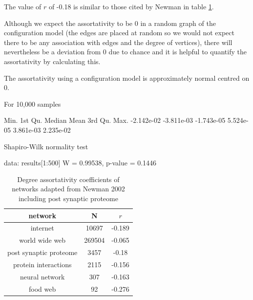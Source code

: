 The value of $r$ of -0.18  is similar to those cited by Newman \cite{newman2002assortative} in table \ref{Table:DegreeAssortativityNewman}. 

Although we expect the assortativity to be 0 in a random graph of the configuration model (the edges are placed at random so we would not expect there to be any association with edges and the degree of vertices), there will nevertheless be a deviation from 0 due to chance and it is helpful to quantify the assortativity by calculating this. 

The assortativity using a configuration model  is approximately normal centred on 0.

For 10,000 samples   

Min.    1st Qu.     Median       Mean    3rd Qu.       Max. 
-2.142e-02 -3.811e-03 -1.743e-05  5.524e-05  3.861e-03  2.235e-02 

Shapiro-Wilk normality test

data:  results[1:500]
W = 0.99538, p-value = 0.1446


\begin{table}[]
    \centering
    \begin{tabular}{c|c|c}
       network  &N& $r$  \\
       \hline
       internet & 10697&-0.189\\
       world wide web &269504 & -0.065\\
       post synaptic proteome & 3457 & -0.18\\
       protein interactions & 2115 & -0.156\\
       neural network & 307 & -0.163\\
       food web & 92 & -0.276 \\
       
       
         
    \end{tabular}
    \caption{Degree assortativity coefficients of networks adapted from Newman 2002 \cite{newman2002assortative} including post synaptic proteome}
    \label{Table:DegreeAssortativityNewman}
\end{table}

 


